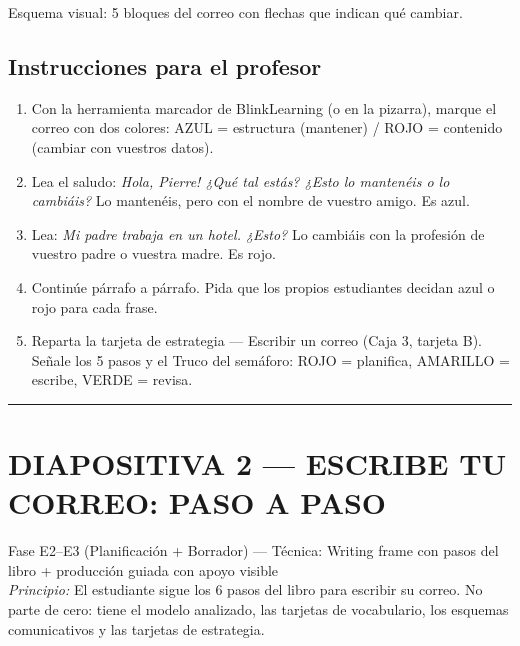 \documentclass[a4paper,11pt]{article}
\begin{document}
Esquema visual: 5 bloques del correo con flechas que indican qué cambiar.

\vspace{0.5cm}

\subsection*{Instrucciones para el profesor}

\begin{enumerate}[leftmargin=1.5cm, itemsep=4pt]
\item Con la herramienta marcador de BlinkLearning (o en la pizarra), marque el correo con dos colores: AZUL = estructura (mantener) / ROJO = contenido (cambiar con vuestros datos).
\item Lea el saludo: \textit{Hola, Pierre! ¿Qué tal estás? ¿Esto lo mantenéis o lo cambiáis?} Lo mantenéis, pero con el nombre de vuestro amigo. Es azul.
\item Lea: \textit{Mi padre trabaja en un hotel. ¿Esto?} Lo cambiáis con la profesión de vuestro padre o vuestra madre. Es rojo.
\item Continúe párrafo a párrafo. Pida que los propios estudiantes decidan azul o rojo para cada frase.
\item Reparta la tarjeta de estrategia — Escribir un correo (Caja 3, tarjeta B). Señale los 5 pasos y el Truco del semáforo: ROJO = planifica, AMARILLO = escribe, VERDE = revisa.
\end{enumerate}

\newpage


\noindent\textcolor{violeta}{\rule{\linewidth}{2.5pt}}

\section*{DIAPOSITIVA 2 — ESCRIBE TU CORREO: PASO A PASO}

{\small Fase E2--E3 (Planificación + Borrador) — Técnica: Writing frame con pasos del libro + producción guiada con apoyo visible}\\
{\small\textit{Principio:} El estudiante sigue los 6 pasos del libro para escribir su correo. No parte de cero: tiene el modelo analizado, las tarjetas de vocabulario, los esquemas comunicativos y las tarjetas de estrategia.}
\end{document}
